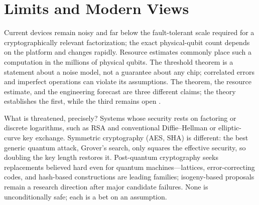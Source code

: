 \section{Limits and Modern Views}

Current devices remain noisy and far below the fault-tolerant scale required for a cryptographically relevant factorization; the exact physical-qubit count depends on the platform and changes rapidly. Resource estimates commonly place such a computation in the millions of physical qubits. The threshold theorem is a statement about a noise model, not a guarantee about any chip; correlated errors and imperfect operations can violate its assumptions. The theorem, the resource estimate, and the engineering forecast are three different claims; the theory establishes the first, while the third remains open \cite{shor-factoring,shor-error}.

What is threatened, precisely? Systems whose security rests on factoring or discrete logarithms, such as RSA and conventional Diffie--Hellman or elliptic-curve key exchange. Symmetric cryptography (AES, SHA) is different: the best generic quantum attack, Grover's search, only squares the effective security, so doubling the key length restores it. Post-quantum cryptography seeks replacements believed hard even for quantum machines---lattices, error-correcting codes, and hash-based constructions are leading families; isogeny-based proposals remain a research direction after major candidate failures. None is unconditionally safe; each is a bet on an assumption.

